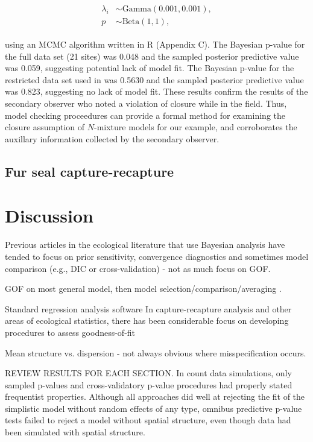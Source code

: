 \documentclass[12pt,english]{article}
\begin{document}
\begin{spacing}{1.9}
\begin{linenomath}
\begin{align}
\begin{split}
          \lambda_i & \sim
          \text{Gamma}(0.001,0.001), \\
          p & \sim \text{Beta}(1,1),
        \end{split}
              \label{eq:nmix2}
      \end{align}
    \end{linenomath}
    using an MCMC algorithm written in R (Appendix C). The Bayesian
    p-value for the full data set (21 sites) was 0.048 and the sampled
    posterior predictive value was 0.059, suggesting
    potential lack
    of model fit. The Bayesian p-value for the restricted data set
    used in \citet{williams2017estimating} was 0.5630 and the sampled
    posterior predictive value was 0.823, suggesting no
    lack of model fit. These results confirm the results of the secondary
    observer who noted a violation of closure while in the
    field. Thus, model checking proceedures can provide a formal method for
    examining the closure assumption of $N$-mixture models for our
    example, and corroborates the auxillary information collected by
    the secondary observer.

    \subsection{Fur seal capture-recapture}

    \section{Discussion}


    Previous articles in the ecological literature that use Bayesian
    analysis have tended to focus on prior sensitivity, convergence
    diagnostics and sometimes model comparison (e.g., DIC or
    cross-validation) - not as much focus on GOF.

    GOF on most general model, then model
    selection/comparison/averaging \citep{BurnhamAnderson2002}.

    Standard regression analysis software In capture-recapture
    analysis and other areas of ecological statistics, there has been
    considerable focus on developing procedures to assess
    goodness-of-fit \citep[e.g.,][]{ChoquetEtAl2009}

    Mean structure vs. dispersion - not always obvious where
    misspecification occurs.
    
    REVIEW RESULTS FOR EACH SECTION.  In count data simulations, only sampled p-values and cross-validatory p-value procedures had properly stated frequentist properties.  Although all approaches did well at rejecting the fit of the simplistic model without random effects of any type, omnibus predictive p-value tests failed to reject a model without spatial structure, even though data had been simulated with spatial structure.


\end{spacing}
\end{document}
